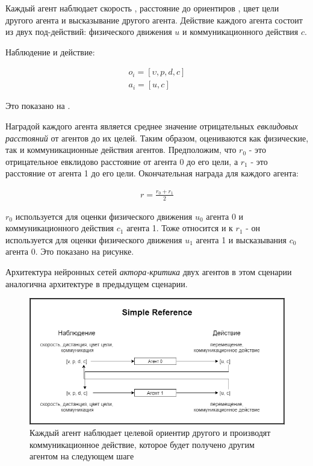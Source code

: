 Каждый агент наблюдает скорость , расстояние до ориентиров , цвет цели другого агента и высказывание другого агента. Действие каждого агента состоит из двух под-действий: физического движения $u$ и коммуникационного действия $c$.

Наблюдение и действие:

\begin{equation}
    \begin{multlined}
        o_i = [\upsilon, p, d, c] \\
        a_i = [u, c]
    \end{multlined}
\end{equation}


Это показано на .

Наградой каждого агента является среднее значение отрицательных \textit{евклидовых расстояний} от агентов до их целей. Таким образом, оцениваются как физические, так и коммуникационные действия агентов. Предположим, что $r_0$ - это отрицательное евклидово расстояние от агента 0 до его цели, а $r_1$ - это расстояние от агента 1 до его цели. Окончательная награда для каждого агента:

\begin{equation}
    \begin{multlined}
        r = \frac{r_0 + r_1}{2}
    \end{multlined}
\end{equation}

$r_0$ используется для оценки физического движения $u_0$ агента 0 и коммуникационного действия $c_1$ агента 1. Тоже относится и к $r_1$ - он используется для оценки физического движения $u_1$ агента 1 и высказывания $c_0$ агента 0. Это показано на рисунке.

Архитектура нейронных сетей \textit{актора-критика} двух агентов в этом сценарии аналогична архитектуре в предыдущем сценарии.

\begin{figure}[ht!]
    \center
    \includegraphics [scale=0.60] {my_folder/images/ch4/simple_reference.png}
    \caption{Каждый агент наблюдает целевой ориентир другого и производят коммуникационное действие, которое будет получено другим агентом на следующем шаге}
    \label{fig:exp-sr}
\end{figure}

